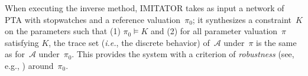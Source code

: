 \documentclass[a4paper,11pt]{report}
\makeatletter
\newcommand{\A}{\mathcal{A}}
\newcommand{\Ko}{K}
\newcommand{\pio}{\pi_0}
\newcommand{\piprime}{\pi}
\newcommand{\hytech}{{\sc HyTech}}
\newcommand{\imitator}{\textsf{IMITATOR}}
\newcommand{\ie}{\textcolor{colorok}{\textit{i.e.},\@}}
\makeatother
\begin{document}
When executing the inverse method, \imitator{} takes as input a network of PTA with stopwatches
and a reference valuation~$\pio$; it synthesizes a constraint~$\Ko$ on the parameters such that (1) $\pio \models \Ko$ and (2) for all parameter valuation~$\piprime$ satisfying $\Ko$, the trace set (\ie{} the discrete behavior) of~$\A$ under~$\piprime$ is the same as for~$\A$ under~$\pio$.
This provides the system with a criterion of \emph{robustness} (see, e.g., \cite{Markey11})
around~$\pio$.


\end{document}
